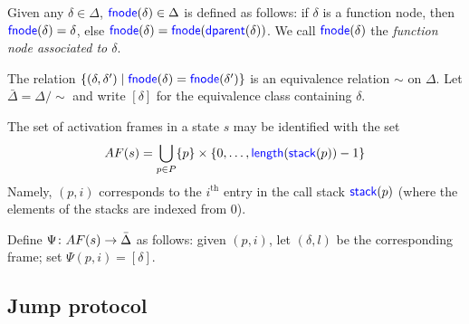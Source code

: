 \documentclass[11pt]{article}
\begin{document}
\begin{definition}
  Given any $\delta\in\Delta$, $\textsf{\textcolor{blue}{\textup{fnode}}}(\delta)\in\Delta$ is defined as
  follows: if $\delta$ is a function node, then
  $\textsf{\textcolor{blue}{\textup{fnode}}}(\delta)=\delta$, else
  $\textsf{\textcolor{blue}{\textup{fnode}}}(\delta)=\textsf{\textcolor{blue}{\textup{fnode}}}(\textsf{\textcolor{blue}{\textup{dparent}}}(\delta))$.  We call $\textsf{\textcolor{blue}{\textup{fnode}}}(\delta)$
  the \emph{function node associated to $\delta$}.
\end{definition}

The relation $\{(\delta,\delta')\mid \textsf{\textcolor{blue}{\textup{fnode}}}(\delta)=\textsf{\textcolor{blue}{\textup{fnode}}}(\delta')\}$
is an equivalence relation $\sim$ on $\Delta$.  Let
$\bar{\Delta}=\Delta/\sim$ and write $[\delta]$ for the equivalence
class containing $\delta$.

The set of activation frames in a state $s$ may be identified with the 
set
\[
AF(s)=\bigcup_{p\in P}\{p\}\times\{0,\ldots,\textsf{\textcolor{blue}{\textup{length}}}(\textsf{\textcolor{blue}{\textup{stack}}}(p))-1\}
\]
Namely, $(p,i)$ corresponds to the $i^{\text{th}}$ entry in the call
stack $\textsf{\textcolor{blue}{\textup{stack}}}(p)$ (where the elements of the stacks are indexed from
$0$).

Define $\Psi\colon AF(s)\rightarrow \bar{\Delta}$ as follows: given $(p,i)$,
let $(\delta,l)$ be the corresponding frame; set $\Psi(p,i)=[\delta]$.



\subsection{Jump protocol}
\label{sec:jump}



\end{document}
